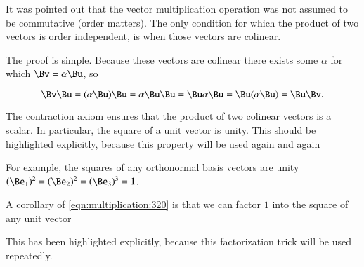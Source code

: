 %
%
It was pointed out that the vector multiplication operation was not assumed to be commutative (order matters).
The only condition for which the product of two vectors is order independent, is when those vectors are colinear.


The proof is simple.
Because these vectors are colinear there exists some \( \alpha \) for which \( \Bv = \alpha \Bu \), so

\begin{dmath}\label{eqn:colinearVectors:380}
\Bv \Bu
=
(\alpha \Bu) \Bu
=
\alpha \Bu \Bu
=
\Bu \alpha \Bu
=
\Bu (\alpha \Bu)
=
\Bu \Bv.
\end{dmath}

The contraction axiom ensures that the product of two colinear vectors is a scalar.
In particular, the square of a unit vector is unity.
This should be highlighted explicitly, because this property will be used again and again

For example, the squares of any orthonormal basis vectors are unity \( (\Be_1)^2 = (\Be_2)^2 = (\Be_3)^3 = 1 \).

A corollary of
\cref{eqn:multiplication:320} is that we can factor \( 1 \) into
the square of any unit vector


This has been highlighted explicitly, because this factorization trick will be used repeatedly.
